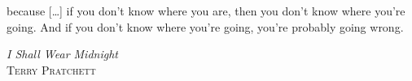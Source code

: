 \renewcommand{\maketitlehooka}{
  \begin{center}
    \noindent

    \begin{figure}[h]
      \centering
      \texttt{[image: kyoto\_u\_logo]}
    \end{figure}
    \textsc{\LARGE Kyoto University}
    
    \textsc{\Large Graduate School of Engineering}

    \textsc{\large Mechanical Engineering Science}
  \end{center}
  \vfill\vfill
}
\renewcommand{\maketitlehookb}{
  \vfill\vfill
  \begin{center}
  {\large A thesis presented for the degree of}

  \textsc{\large Master of Science}
  \end{center}
  \vfill\vfill
}
\renewcommand{\maketitlehookc}{
  \vfill
}
\renewcommand{\maketitlehookd}{
  \begin{center}
    \begin{figure}[h]
      \centering
      \texttt{[image: by-sa-big]}
    \end{figure}
  \end{center}
}

\title{\mytitle}
\author{Jean \textsc{Nassar} \\\emph{Author} \and Dr.~Fumitoshi \textsc{Matsuno}\\\emph{Supervisor}}
\date{\today}

\begin{titlingpage}
\maketitle
\end{titlingpage}

\thispagestyle{empty}
  \null{}
    \noindent
    because [\ldots] if you don't know where you are, then you don't know where you're going.
    And if you don't know where you're going, you're probably going wrong.

    \begin{flushright}
      \emph{I Shall Wear Midnight}\\
      \textsc{Terry Pratchett}
    \end{flushright}
  \null

